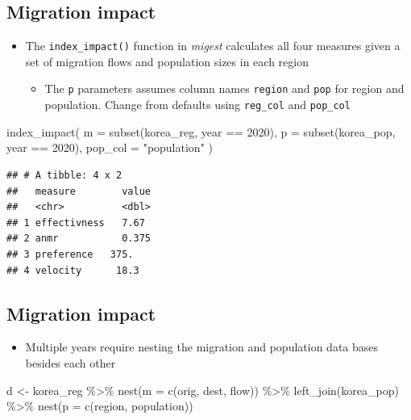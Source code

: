 \documentclass[
]{book}
\newenvironment{Shaded}{\begin{snugshade}}{\end{snugshade}}
\newcommand{\AttributeTok}[1]{\textcolor[rgb]{0.77,0.63,0.00}{#1}}
\newcommand{\DecValTok}[1]{\textcolor[rgb]{0.00,0.00,0.81}{#1}}
\newcommand{\FunctionTok}[1]{\textcolor[rgb]{0.00,0.00,0.00}{#1}}
\newcommand{\NormalTok}[1]{#1}
\newcommand{\OtherTok}[1]{\textcolor[rgb]{0.56,0.35,0.01}{#1}}
\newcommand{\SpecialCharTok}[1]{\textcolor[rgb]{0.00,0.00,0.00}{#1}}
\newcommand{\StringTok}[1]{\textcolor[rgb]{0.31,0.60,0.02}{#1}}
\providecommand{\tightlist}{%
  \setlength{\itemsep}{0pt}\setlength{\parskip}{0pt}}
\begin{document}
\hypertarget{migration-impact-1}{%
\subsection{Migration impact}\label{migration-impact-1}}

\begin{itemize}
\tightlist
\item
  The \texttt{index\_impact()} function in \emph{migest} calculates all four measures given a set of migration flows and population sizes in each region

  \begin{itemize}
  \tightlist
  \item
    The \texttt{p} parameters assumes column names \texttt{region} and \texttt{pop} for region and population. Change from defaults using \texttt{reg\_col} and \texttt{pop\_col}
  \end{itemize}
\end{itemize}

\begin{Shaded}
\begin{Highlighting}[]
\FunctionTok{index\_impact}\NormalTok{(}
  \AttributeTok{m =} \FunctionTok{subset}\NormalTok{(korea\_reg, year }\SpecialCharTok{==} \DecValTok{2020}\NormalTok{),}
  \AttributeTok{p =} \FunctionTok{subset}\NormalTok{(korea\_pop, year }\SpecialCharTok{==} \DecValTok{2020}\NormalTok{),}
  \AttributeTok{pop\_col =} \StringTok{"population"}
\NormalTok{)}
\end{Highlighting}
\end{Shaded}

\begin{verbatim}
## # A tibble: 4 x 2
##   measure        value
##   <chr>          <dbl>
## 1 effectivness   7.67 
## 2 anmr           0.375
## 3 preference   375.   
## 4 velocity      18.3
\end{verbatim}

\hypertarget{migration-impact-2}{%
\subsection{Migration impact}\label{migration-impact-2}}

\begin{itemize}
\tightlist
\item
  Multiple years require nesting the migration and population data bases besides each other
\end{itemize}

\begin{Shaded}
\begin{Highlighting}[]
\NormalTok{d }\OtherTok{\textless{}{-}}\NormalTok{ korea\_reg }\SpecialCharTok{\%\textgreater{}\%}
  \FunctionTok{nest}\NormalTok{(}\AttributeTok{m =} \FunctionTok{c}\NormalTok{(orig, dest, flow)) }\SpecialCharTok{\%\textgreater{}\%}
  \FunctionTok{left\_join}\NormalTok{(korea\_pop) }\SpecialCharTok{\%\textgreater{}\%}
  \FunctionTok{nest}\NormalTok{(}\AttributeTok{p =} \FunctionTok{c}\NormalTok{(region, population))}
\end{Highlighting}
\end{Shaded}
\end{document}
